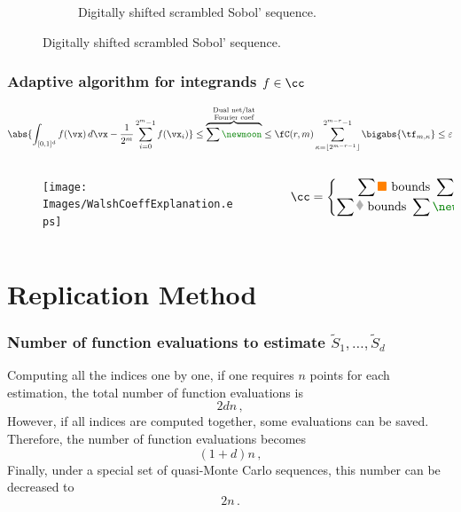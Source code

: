 \documentclass[11pt,compress]{beamer} %
\newcommand*{\Scale}[2][4]{\scalebox{#1}{$#2$}}%
\newcommand{\sqdiamond}[1][fill=gray_plot]{\tikz [x=1.2ex,y=1.85ex,line width=.1ex,line join=round, yshift=-0.285ex] \draw  [#1]  (0,.5) -- (.5,1) -- (1,.5) -- (.5,0) -- (0,.5) -- cycle;}%
\begin{document}
\begin{frame}
\begin{figure}
\begin{subfigure}[b]{0.45\textwidth}
\caption*{Digitally shifted scrambled Sobol' sequence.}
\end{subfigure}
\end{figure}
\end{frame}

\begin{frame}
\frametitle{Adaptive algorithm for integrands $f\in\cc$}
\[\Scale[0.90]{\displaystyle
\abs{\int_{[0,1]^d} f(\vx)\, d\vx - \frac{1}{2^m} \sum\limits_{i=0}^{2^m-1} f(\vx_i)} \leq 
\overbrace{\sum \textcolor{green_plot}{\boldsymbol{\newmoon}}}^{\substack{\text{Dual 
net/lat} \\ \text{Fourier coef}}} \leq \fC(r,m)\sum_{\kappa=\left \lfloor 2^{m-r-1}\right 
\rfloor}^{2^{m-r}-1} \bigabs{\tf_{m,\kappa}} \leq \varepsilon
}\]
\vspace{-.5cm}
\begin{columns}
\begin{column}{0.6\textwidth}
\centering
\begin{figure}
\texttt{[image: Images/WalshCoeffExplanation.eps]}
\end{figure}
\end{column}
\begin{column}{0.4\textwidth}
\centering
$\cc=\begin{Bmatrix}\displaystyle\sum\textcolor{orange_plot}{\pmb{\blacksquare}}\text{ bounds }\sum\textcolor{gray_plot}{\boldsymbol{\sqdiamond}}\\
\displaystyle\sum\textcolor{gray_plot}{\boldsymbol{\sqdiamond}}\text{ bounds }\sum\textcolor{green_plot}{\boldsymbol{\newmoon}}\end{Bmatrix}$
\end{column}
\end{columns}
\end{frame}

\section{Replication Method}

\begin{frame}
\frametitle{Number of function evaluations to estimate $\widetilde{S}_1,\dots,\widetilde{S}_d$}
Computing all the indices one by one, if one requires $n$ points for each estimation, the total number of function evaluations is
\[
2dn\, ,
\]
However, if all indices are computed together, some evaluations can be saved. Therefore, the number of function evaluations becomes
\[
(1+d)n\, ,
\]
Finally, under a special set of quasi-Monte Carlo sequences, this number can be decreased to
\[
2n\, .
\]
\end{frame}
\end{document}

